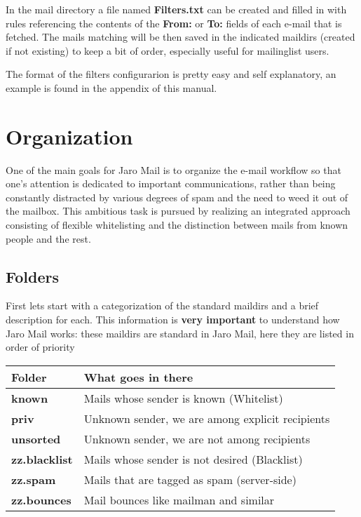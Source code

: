 \documentclass[a4,onecolumn,portrait]{article}
\begin{document}
In the mail directory a file named \textbf{Filters.txt} can be created and
filled in with rules referencing the contents of the \textbf{From:}
or \textbf{To:} fields of each e-mail that is fetched. The mails matching
will be then saved in the indicated maildirs (created if not
existing) to keep a bit of order, especially useful for mailinglist
users.

The format of the filters configurarion is pretty easy and self
explanatory, an example is found in the appendix of this manual.

\section{Organization}
\label{sec-5}

One of the main goals for Jaro Mail is to organize the e-mail workflow
so that one's attention is dedicated to important communications,
rather than being constantly distracted by various degrees of spam and
the need to weed it out of the mailbox. This ambitious task is pursued
by realizing an integrated approach consisting of flexible
whitelisting and the distinction between mails from known people and
the rest.

\subsection{Folders}
\label{sec-5-1}

First lets start with a categorization of the standard maildirs and a
brief description for each. This information is \textbf{very important} to
understand how Jaro Mail works: these maildirs are standard in Jaro
Mail, here they are listed in order of priority

\begin{center}
\begin{tabular}{ll}
Folder & What goes in there\\
\hline
\textbf{known} & Mails whose sender is known (Whitelist)\\
\textbf{priv} & Unknown sender, we are among explicit recipients\\
\textbf{unsorted} & Unknown sender, we are not among recipients\\
\textbf{zz.blacklist} & Mails whose sender is not desired (Blacklist)\\
\textbf{zz.spam} & Mails that are tagged as spam (server-side)\\
\textbf{zz.bounces} & Mail bounces like mailman and similar\\
\end{tabular}
\end{center}
\end{document}
